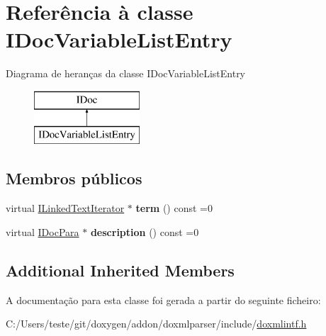 \hypertarget{class_i_doc_variable_list_entry}{\section{Referência à classe I\-Doc\-Variable\-List\-Entry}
\label{class_i_doc_variable_list_entry}
}
Diagrama de heranças da classe I\-Doc\-Variable\-List\-Entry\begin{figure}[H]
\begin{center}
\leavevmode
\includegraphics[height=2.000000cm]{class_i_doc_variable_list_entry}
\end{center}
\end{figure}
\subsection*{Membros públicos}
\begin{DoxyCompactItemize}
\item 
\hypertarget{class_i_doc_variable_list_entry_a936ff992ec209d8aa37201b6ba174c38}{virtual \hyperlink{class_i_linked_text_iterator}{I\-Linked\-Text\-Iterator} $\ast$ {\bfseries term} () const =0}\label{class_i_doc_variable_list_entry_a936ff992ec209d8aa37201b6ba174c38}

\item 
\hypertarget{class_i_doc_variable_list_entry_a66d14328150513d657e222a22970e2e5}{virtual \hyperlink{class_i_doc_para}{I\-Doc\-Para} $\ast$ {\bfseries description} () const =0}\label{class_i_doc_variable_list_entry_a66d14328150513d657e222a22970e2e5}

\end{DoxyCompactItemize}
\subsection*{Additional Inherited Members}


A documentação para esta classe foi gerada a partir do seguinte ficheiro\-:\begin{DoxyCompactItemize}
\item 
C\-:/\-Users/teste/git/doxygen/addon/doxmlparser/include/\hyperlink{include_2doxmlintf_8h}{doxmlintf.\-h}\end{DoxyCompactItemize}
